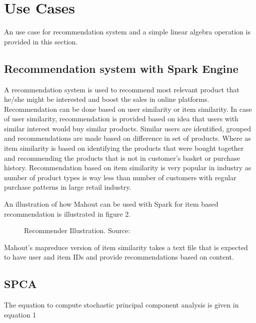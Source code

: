 \documentclass[9pt,twocolumn,twoside]{../../styles/osajnl}
\begin{document}
\section{Use Cases}

An use case for recommendation system and a simple linear algebra
operation is provided in this section.

\subsection{Recommendation system with Spark Engine}
A recommendation system is used to recommend most relevant product
that he/she might be interested and boost the sales in online
platforms. Recommendation can be done based on user similarity or item
similarity. In case of user similarity, recommendation is provided
based on idea that users with similar interest would buy similar
products. Similar users are identified, grouped and recommendations
are made based on difference in set of products. Where as item
similarity is based on identifying the products that were bought
together and recommending the products that is not in customer's
basket or purchase history. Recommendation based on item similarity is
very popular in industry as number of product types is way less than
number of customers with regular purchase patterns in large retail
industry.

An illustration of how Mahout can be used with Spark for item based
recommendation is illustrated in figure 2.

\begin{figure}[htbp]
\centering
{}
\caption{Recommender Illustration. \newline Source: \cite{www-recommendations}}
\label{fig:false-color}
\end{figure}
Mahout's mapreduce version of item similarity takes a text file that is
expected to have user and item IDs and provide recommendations based
on content.

\subsection{SPCA}
The equation to compute stochastic principal component analysis is
given in equation 1
\end{document}
